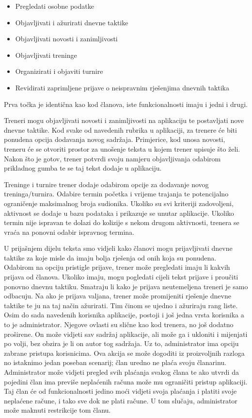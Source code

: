 \documentclass{article}
\begin{document}
		\begin{itemize}
			\item Pregledati osobne podatke 
			\item Objavljivati i ažurirati dnevne taktike 
			\item Objavljivati novosti i zanimljivosti 
			\item Objavljivati treninge 
			\item Organizirati i objaviti turnire 
			\item Revidirati zaprimljene prijave o neispravnim rješenjima dnevnih taktika 
		\end{itemize} 
		
		Prva točka je identična kao kod članova, iste funkcionalnosti imaju i jedni i drugi. 
		
		Treneri mogu objavljivati novosti i zanimljivosti na aplikaciju te postavljati nove dnevne taktike. Kod svake od navedenih rubrika u aplikaciji, za trenere će biti ponudena opcija dodavanja novog sadržaja. Primjerice, kod unosa novosti, treneru će se otvoriti prostor za unošenje teksta u kojem trener upisuje što želi. Nakon što je gotov, trener potvrdi svoju namjeru objavljivanja odabirom prikladnog gumba te se taj tekst dodaje u aplikaciju. 
		
		Treninge i turnire trener dodaje odabirom opcije za dodavanje novog treninga/turnira. Odabire termin početka i vrijeme trajanja te potencijalno ograničenje maksimalnog broja sudionika. Ukoliko su svi kriteriji zadovoljeni, aktivnost se dodaje u bazu podataka i prikazuje se unutar aplikacije. Ukoliko termin nije ispravan te dolazi do kolizije s nekom drugom aktivnosti, trenera se vraća na ponovni odabir ispravnog termina. 
		
		U prijašnjem dijelu teksta smo vidjeli kako članovi mogu prijavljivati dnevne taktike za koje misle da imaju bolja rješenja od onih koja su ponudena. Odabirom na opciju pristigle prijave, trener može pregledati imaju li kakvih prijava od članova. Ukoliko imaju, mogu pogledati cijeli tekst prijave i proučiti ponovno dnevnu taktiku. Smatraju li kako je prijava neutemeljena treneri je samo odbacuju. Na ako je prijava valjana, trener može promijeniti rješenje dnevne taktike te ju na taj način ažurirati. Tim činom se ujedno i ažuriraju rang liste.\\ 
		
		
		Osim do sada navedenih korisnika aplikacije, postoji i još jedna vrsta korisnika a to je administrator. Njegove ovlasti su slične kao kod trenera, no još dodatno proširene. On može vidjeti sav sadržaj aplikacije, ali može ga i ukloniti i mijenjati po volji, bez obzira je li on autor tog sadržaja. Uz to, administrator ima opciju zabrane pristupa korisnicima. Ova akcija se može dogoditi iz proizvoljnih razloga no istaknimo jedan poseban scenarij; član uredno ne plaća svoju članarinu. Administrator može vidjeti pregled svih plaćanja svakog člana te ako utvrdi da pojedini član ima previše neplaćenih računa može mu ograničiti pristup aplikaciji. Taj član će od funkcionalnosti jedino moći vidjeti svoja plaćanja i platiti svoje neplaćene račune, i tako sve dok ne plati račune. U tom slučaju, administrator može maknuti restrikcije tom članu.
		\eject 
		
\end{document}
